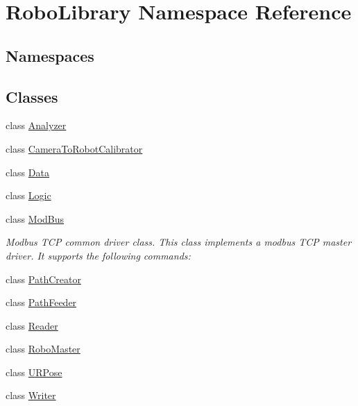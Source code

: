 \hypertarget{namespace_robo_library}{}\section{Robo\+Library Namespace Reference}
\label{namespace_robo_library}
\subsection*{Namespaces}
\begin{DoxyCompactItemize}
\end{DoxyCompactItemize}
\subsection*{Classes}
\begin{DoxyCompactItemize}
\item 
class \hyperlink{class_robo_library_1_1_analyzer}{Analyzer}
\item 
class \hyperlink{class_robo_library_1_1_camera_to_robot_calibrator}{Camera\+To\+Robot\+Calibrator}
\item 
class \hyperlink{class_robo_library_1_1_data}{Data}
\item 
class \hyperlink{class_robo_library_1_1_logic}{Logic}
\item 
class \hyperlink{class_robo_library_1_1_mod_bus}{Mod\+Bus}
\begin{DoxyCompactList}\small\item\em Modbus T\+CP common driver class. This class implements a modbus T\+CP master driver. It supports the following commands\+: \end{DoxyCompactList}\item 
class \hyperlink{class_robo_library_1_1_path_creator}{Path\+Creator}
\item 
class \hyperlink{class_robo_library_1_1_path_feeder}{Path\+Feeder}
\item 
class \hyperlink{class_robo_library_1_1_reader}{Reader}
\item 
class \hyperlink{class_robo_library_1_1_robo_master}{Robo\+Master}
\item 
class \hyperlink{class_robo_library_1_1_u_r_pose}{U\+R\+Pose}
\item 
class \hyperlink{class_robo_library_1_1_writer}{Writer}
\end{DoxyCompactItemize}
